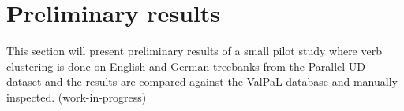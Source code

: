 \section{Preliminary results}\label{sec:prelim}

This section will present preliminary results of a small pilot study where verb clustering is done on English and German treebanks from the Parallel UD dataset and the results are compared against the ValPaL database and manually inspected. (work-in-progress)